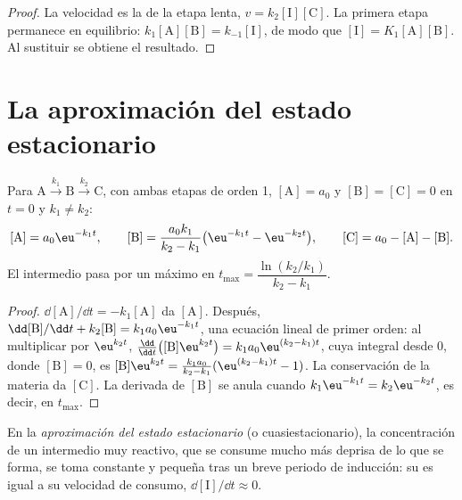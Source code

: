 \begin{proof}
La velocidad es la de la etapa lenta, $v = k_2[\mathrm{I}][\mathrm{C}]$.
La primera etapa permanece en equilibrio: $k_1[\mathrm{A}][\mathrm{B}] =
k_{-1}[\mathrm{I}]$, de modo que $[\mathrm{I}] = K_1[\mathrm{A}][\mathrm{B}]$.
Al sustituir se obtiene el resultado.
\end{proof}

\section{La aproximación del estado estacionario}

\begin{theorem}\label{thm:b1:elementary-steps:consecutive}
Para $\mathrm{A} \xrightarrow{k_1} \mathrm{B} \xrightarrow{k_2} \mathrm{C}$,
con ambas etapas de orden 1, $[\mathrm{A}] = a_0$ y $[\mathrm{B}] =
[\mathrm{C}] = 0$ en $t = 0$ y $k_1 \ne k_2$:
\[
  [\mathrm{A}] = a_0\eu^{-k_1t}, \qquad
  [\mathrm{B}] = \frac{a_0k_1}{k_2 - k_1}\big(\eu^{-k_1t} - \eu^{-k_2t}\big),
  \qquad [\mathrm{C}] = a_0 - [\mathrm{A}] - [\mathrm{B}] .
\]
El intermedio pasa por un máximo en $t_{\max} = \dfrac{\ln(k_2/k_1)}
{k_2 - k_1}$.
\end{theorem}

\begin{proof}
$\dd[\mathrm{A}]/\dd t = -k_1[\mathrm{A}]$ da $[\mathrm{A}]$. Después,
$\dd[\mathrm{B}]/\dd t + k_2[\mathrm{B}] = k_1a_0\eu^{-k_1t}$, una ecuación
lineal de primer orden: al multiplicar por $\eu^{k_2t}$, $\frac{\dd}{\dd t}
\big([\mathrm{B}]\eu^{k_2t}\big) = k_1a_0\eu^{(k_2-k_1)t}$, cuya integral
desde 0, donde $[\mathrm{B}] = 0$, es $[\mathrm{B}]\eu^{k_2t} =
\frac{k_1a_0}{k_2-k_1}(\eu^{(k_2-k_1)t} - 1)$. La conservación de la
materia da $[\mathrm{C}]$. La derivada de $[\mathrm{B}]$ se anula cuando
$k_1\eu^{-k_1t}
= k_2\eu^{-k_2t}$, es decir, en $t_{\max}$.
\end{proof}

\begin{definition}\label{def:b1:elementary-steps:qssa}
En la \emph{aproximación del estado estacionario}
(o cuasiestacionario), la concentración de un intermedio muy reactivo,
que se consume mucho más deprisa de lo que se forma, se toma constante y
pequeña tras un breve periodo de inducción: su  es
igual a su velocidad de consumo,
$\dd[\mathrm{I}]/\dd t \approx 0$.
\end{definition}

